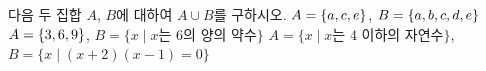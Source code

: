 다음 두 집합 $A$, $B$에 대하여 $A\cup B$를 구하시오.
 $A=\{a{,}\mkern3mu\mathopen{}c{,}\mkern3mu\mathopen{}e\}$, $B=\{a{,}\mkern3mu\mathopen{}b{,}\mkern3mu\mathopen{}c{,}\mkern3mu\mathopen{}d{,}\mkern3mu\mathopen{}e\}$
 $A=\{3{,}\mkern3mu\mathopen{}6{,}\mkern3mu\mathopen{}9\}$, $B=\{x \mid x$는 $6$의 양의 약수$\}$
 $A=\{x \mid x$는 $4$ 이하의 자연수$\}$,\\ $B=\{x \mid (x+2)(x-1)=0\}$
